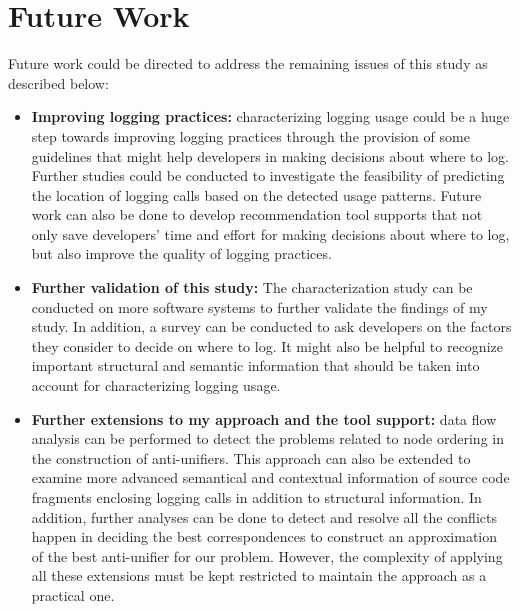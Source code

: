 \section{Future Work}  \label{fw}
Future work could be directed to address the remaining issues of this study as described below:
\begin{itemize} [leftmargin=.5in]

\item \textbf{Improving logging practices:} characterizing logging usage could be a huge step towards improving logging practices through the provision of some guidelines that might help developers in making decisions about where to log. Further studies could be conducted to investigate the feasibility of predicting the location of logging calls based on the detected usage patterns. Future work can also be done to develop recommendation tool supports that not only save developers’ time and effort for making decisions about where to log, but also improve the quality of logging practices. 


\item \textbf{Further validation of this study:} The characterization study can be conducted on more software systems to further validate the findings of my study. In addition, a survey can be conducted to ask developers on the factors they consider to decide on where to log. It might also be helpful to recognize important structural and semantic information that should be taken into account for characterizing logging usage.


\item \textbf{Further extensions to my approach and the tool support:} data flow analysis can be performed to detect the problems related to node ordering in the  construction of anti-unifiers. This approach can also be extended to examine more advanced semantical and contextual information of source code fragments enclosing logging calls in addition to structural information. In addition, further analyses can be done to detect and resolve all the conflicts happen in deciding the best correspondences to construct an approximation of the best anti-unifier for our problem. However, the complexity of applying all these extensions must be kept restricted to maintain the approach as a practical one. 


\end{itemize}
